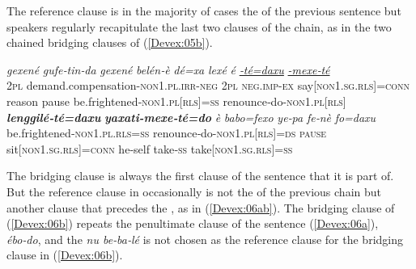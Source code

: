 \documentclass[output=paper]{LSP/langsci}
\begin{document}
The reference clause is in the majority of cases the  of the previous sentence but speakers regularly recapitulate the last two clauses of the chain, as in the two chained bridging clauses of (\ref{Devex:05b}).

		
\begin{exe}
\ex \label{Devex:05ab}
\begin{xlist}
\ex \label{Devex:05a}			
\gll \textit{gexené} \textit{gufe‑tin‑da} \textit{gexené} \textit{belén‑è} \textit{dé=xa} \textit{lexé} \textit{é} \underline{\textit{‑té=daxu}} \underline{\textit{-mexe‑té}}\\
\textsc{2pl}  demand.compensation-\textsc{non1.pl.irr-neg} \textsc{2pl} \textsc{neg.imp-ex} say[\textsc{non1.sg.rls}]=\textsc{conn} reason pause be.frightened‑\textsc{non1.pl[rls]=ss} renounce‑do-\textsc{non1.pl[rls]}\\
\glt {} 		
\ex \label{Devex:05b}			
\gll \textbf{\textit{lenggilé‑té=daxu}} \textbf{\textit{yaxati-mexe‑té=do}} \textit{è} 	\textit{babo=fexo} \textit{ye‑pa} \textit{fe‑nè}  \textit{fo=daxu}\\ 
be.frightened‑\textsc{non1.pl.rls=ss} renounce‑do-\textsc{non1.pl[rls]=ds}      	\textsc{pause} sit[\textsc{non1.sg.rls}]=\textsc{conn} he‑self	take‑\textsc{ss} take[\textsc{non1.sg.rls}]=\textsc{ss}\\ 
\glt {}	
\end{xlist}
\end{exe}

The bridging clause is always the first clause of the sentence that it is part of. But the reference clause in  occasionally is not the  of the previous chain but another clause that precedes the , as in (\ref{Devex:06ab}). The bridging clause of (\ref{Devex:06b}) repeats the penultimate clause of the sentence (\ref{Devex:06a}), \textit{ébo‑do}, and the  \textit{nu be‑ba‑lé} is not chosen as the reference clause for the bridging clause in (\ref{Devex:06b}).
\end{document}
